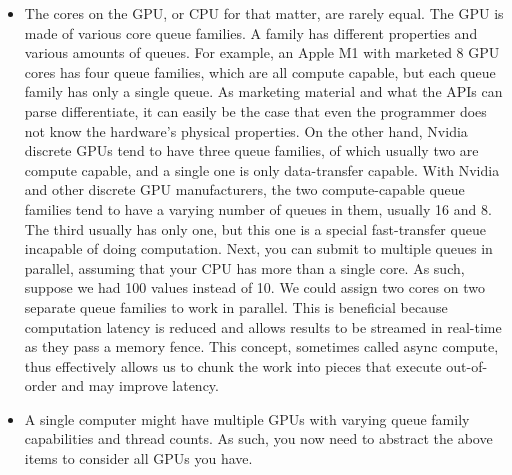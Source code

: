 \documentclass{report}
\begin{document}
\begin{enumerate}
\begin{itemize}
        \item The cores on the GPU, or CPU for that matter, are rarely equal. The GPU is made of various core queue families. A family has different properties and various amounts of queues. For example, an Apple M1 with marketed 8 GPU cores has four queue families, which are all compute capable, but each queue family has only a single queue. As marketing material and what the APIs can parse differentiate, it can easily be the case that even the programmer does not know the hardware's physical properties. On the other hand, Nvidia discrete GPUs tend to have three queue families, of which usually two are compute capable, and a single one is only data-transfer capable. With Nvidia and other discrete GPU manufacturers, the two compute-capable queue families tend to have a varying number of queues in them, usually 16 and 8. The third usually has only one, but this one is a special fast-transfer queue incapable of doing computation. Next, you can submit to multiple queues in parallel, assuming that your CPU has more than a single core. As such, suppose we had 100 values instead of 10. We could assign two cores on two separate queue families to work in parallel. This is beneficial because computation latency is reduced and allows results to be streamed in real-time as they pass a memory fence. This concept, sometimes called async compute, thus effectively allows us to chunk the work into pieces that execute out-of-order and may improve latency.
        \item A single computer might have multiple GPUs with varying queue family capabilities and thread counts. As such, you now need to abstract the above items to consider all GPUs you have.
    \end{itemize}
\end{enumerate}
\end{document}

